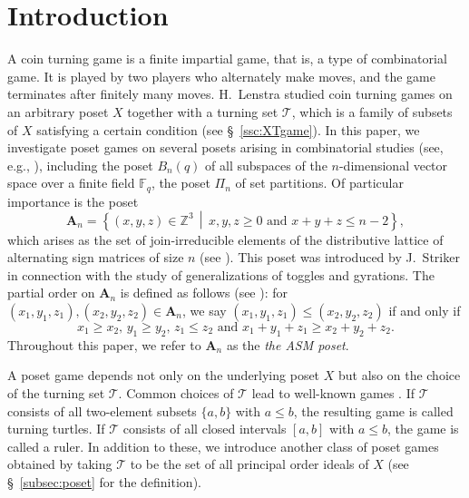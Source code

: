 \documentclass[a4paper,11pt]{amsart}
\theoremstyle{definition}
\numberwithin{equation}{section}
\def\Int{\mathbb{Z}}
\def\F{\mathbb{F}}
\def\T{\mathscr{T}}
\def\ASM#1{\boldsymbol{A}_{#1}}
\begin{document}
\section{Introduction}
%
A coin turning game is a finite impartial game, that is, a type of combinatorial game.
It is played by two players who alternately make moves, and the game terminates after finitely many moves.
%
H.~Lenstra \cite{Lenstra} studied coin turning games on an arbitrary poset $X$
together with a turning set $\T$,
which is a family of subsets of $X$ satisfying a certain condition (see \S~\ref{ssc:XTgame}).
In this paper, we investigate poset games on several posets arising in combinatorial studies (see, e.g., \cite{ec1}), 
including the poset $B_n(q)$ of all subspaces of the $n$-dimensional vector space over a finite field $\F_{q}$,
the poset $\Pi_{n}$ of set partitions.
Of particular importance is the poset
\begin{equation}\label{eq:ASM-set}
	\ASM{n}
	=
	\left\{
		(x, y, z) \in \Int^{3}
	\, \middle| \,
		x, y, z \geq 0
		\textrm{ and }
		x + y + z \leq n - 2
	\right\},
\end{equation}
which arises as the set of join-irreducible elements of the distributive lattice of alternating sign matrices of size $n$ (see \cite{Br,Ku,MRR1,MRR2,Oh,St}).
This poset was introduced by J.~Striker \cite{SW,St} in connection with the study of generalizations of toggles and gyrations.
The partial order on $\ASM{n}$ is defined as follows (see \cite[Definition~3.3]{St}):
for $(x_{1}, y_{1}, z_{1}),(x_{2}, y_{2}, z_{2})\in\ASM{n}$,
we say $(x_{1}, y_{1}, z_{1})\leq (x_{2}, y_{2}, z_{2})$ if and only if
\begin{equation}\label{eq:ASM-order}
x_{1}\geq x_{2},\, y_{1}\geq y_{2},\, z_{1}\leq z_{2} \text{ and } x_{1}+y_{1}+z_{1}\geq x_{2}+y_{2}+z_{2}.
\end{equation}
Throughout this paper, we refer to $\ASM{n}$ as the \textsl{the ASM poset}.
%
\par\smallskip
%
A poset game \cite{Lenstra,Sato} depends not only on the underlying poset $X$ 
but also on the choice of the turning set $\T$.
Common choices of $\T$ lead to well-known games \cite{Sato}.
If $\T$ consists of all two-element subsets $\{a,b\}$ with $a\leq b$,
the resulting game is called turning turtles.
If $\T$ consists of all closed intervals $[a,b]$ with $a\leq b$,
the game is called a ruler.
In addition to these, we introduce another class of poset games obtained by taking $\T$
to be the set of all principal order ideals of $X$ (see \S~\ref{subsec:poset} for the definition).
\end{document}
